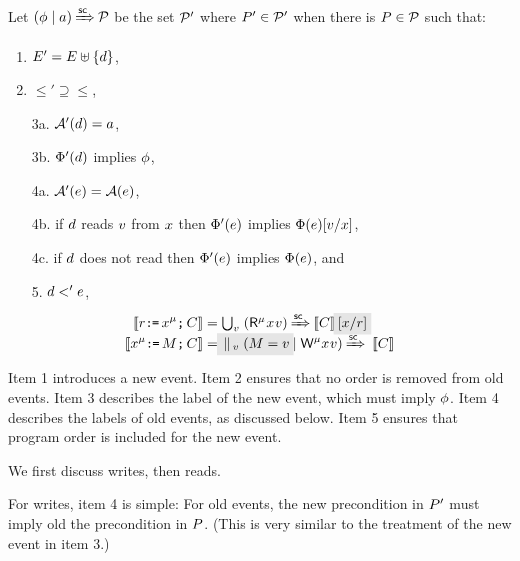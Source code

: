 \begin{candidate}
  \label{def:pre-sc}
Let $(\phi \mid a) \mathbin{{\xRightarrow{{\mathsf{sc}}}}} \mathcal{P}$ be the set $\mathcal{P}'$ where $P'\in\mathcal{P}'$ when
there is $P\in\mathcal{P}$ such that:
\begin{enumerate}
\item\label{pre-E} $E' = E \uplus \{d\}$,
\item\label{pre-le} ${\le'}\supseteq{\le}$, %
\item[3a.] $\mathcal{A}'(d) = a$,
\item[3b.] $\Phi'(d)$ implies $\phi$,
\item[4a.] $\mathcal{A}'(e) = \mathcal{A}(e)$,
\item[4b.] if $d$ \externally reads $v$ from $x$ then
  $\Phi'(e)$ implies $\Phi(e)[v/x]$,
\item[4c.] if $d$ does not \externally read then
  $\Phi'(e)$ implies $\Phi(e)$, and
\item[5.] $d <' e$, 
\end{enumerate}
\vspace{-1ex}
    \begin{align*}
    \sem{\aReg\GETS\aLoc^\amode\SEMI \aCmd} & =
    \smash{\textstyle\bigcup_\aVal\; (\DRmode\aLoc\aVal) \prefixsc \sem{\aCmd}\mkern3.5mu \mathhl{[\aLoc/\aReg] }}
    \\
    \sem{\aLoc^\amode\GETS{\aExp}\SEMI \aCmd} & =
    \smash{\mathhl{\textstyle\PAR_\aVal\; (\aExp=\aVal} \mid \DWmode\aLoc\aVal) \prefixsc\; \sem{\aCmd}}
  \end{align*}
\end{candidate}

Item 1 introduces a new event.  Item 2 ensures that no order is removed from old
events. Item 3 describes the label of the new event, which must imply
$\phi$. Item 4 describes the labels of old events, as discussed below.
Item 5 ensures that program order is included for the new event.

We first discuss writes, then reads.

For writes, item 4 is simple: For old events, the new precondition in $P'$
must imply old the precondition in $P$.  (This is very similar to the
treatment of the new event in item 3.)

